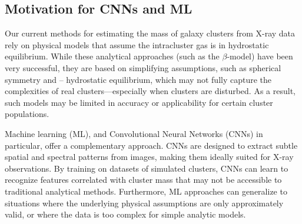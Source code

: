 \subsection{Motivation for CNNs and ML}

Our current methods for estimating the mass of galaxy clusters 
from X-ray data rely on physical models that assume the intracluster gas is in 
hydrostatic equilibrium. While these analytical approaches 
(such as the $\beta$-model) have been very successful, they are 
based on simplifying assumptions, such as spherical symmetry and --
hydrostatic equilibrium, which may not fully capture the complexities of 
real clusters—especially when clusters are disturbed. As a result, 
such models may be limited in accuracy or 
applicability for certain cluster populations.

Machine learning (ML), and Convolutional Neural Networks (CNNs) 
in particular, offer a complementary approach. CNNs are designed 
to extract subtle spatial and spectral patterns from images,
making them ideally suited for X-ray observations.
By training on  datasets of simulated clusters, CNNs can 
learn to recognize features correlated 
with cluster mass that may not be accessible to traditional 
analytical methods. Furthermore, ML approaches can generalize 
to situations where the underlying 
physical assumptions are only approximately valid, or where 
the data is too complex for simple analytic models.
